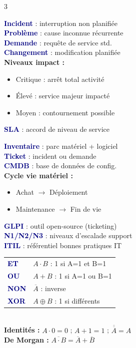 \documentclass[a4paper,9pt]{article}
\newcommand{\key}[1]{\textbf{\textcolor{navy}{#1}}}
\begin{document}
\begin{multicols}{3}
\begin{tcolorbox}[basebox, colframe=crimson, title=GESTION INCIDENTS — ITIL]
\key{Incident} : interruption non planifiée \\
\key{Problème} : cause inconnue récurrente \\
\key{Demande} : requête de service std. \\
\key{Changement} : modification planifiée \\[2pt]
\textbf{Niveaux impact :}
\begin{itemize}
  \item Critique : arrêt total activité
  \item Élevé : service majeur impacté
  \item Moyen : contournement possible
\end{itemize}
\key{SLA} : accord de niveau de service
\end{tcolorbox}

\begin{tcolorbox}[basebox, colframe=green, title=GESTION PATRIMOINE — GLPI]
\key{Inventaire} : parc matériel + logiciel \\
\key{Ticket} : incident ou demande \\
\key{CMDB} : base de données de config. \\[2pt]
\textbf{Cycle vie matériel :}
\begin{itemize}
  \item Achat $\to$ Déploiement
  \item Maintenance $\to$ Fin de vie
\end{itemize}
\key{GLPI} : outil open-source (ticketing) \\
\key{N1/N2/N3} : niveaux d'escalade support \\
\key{ITIL} : référentiel bonnes pratiques IT
\end{tcolorbox}

\begin{tcolorbox}[basebox, colframe=navy, title=MATHS — Algèbre Booléenne]
{\footnotesize
\begin{tabular}{@{}ll@{}}
\key{ET} & $A \cdot B$ : 1 si A=1 et B=1 \\
\key{OU} & $A + B$ : 1 si A=1 ou B=1 \\
\key{NON} & $\overline{A}$ : inverse \\
\key{XOR} & $A \oplus B$ : 1 si différents \\
\end{tabular}}
\vspace{2pt} \\
\textbf{Identités :} $A \cdot 0=0$ ; $A+1=1$ ; $\overline{\overline{A}}=A$ \\
\textbf{De Morgan :} $\overline{A \cdot B} = \overline{A}+\overline{B}$
\end{tcolorbox}


\end{multicols}
\end{document}
